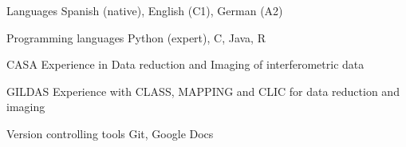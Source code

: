 

\begin{cvskills}

  \cvskill
    {Languages} %
    {Spanish (native), English (C1), German (A2)} %
    

  \cvskill
    {Programming languages} %
    {Python (expert), C, Java, R} %


  \cvskill
    {CASA} %
    {Experience in Data reduction and Imaging of interferometric data} %


  \cvskill
    {GILDAS} %
    {Experience with CLASS, MAPPING and CLIC for data reduction and imaging} %


  \cvskill
    {Version controlling tools} %
    {Git, Google Docs} %


\end{cvskills}
